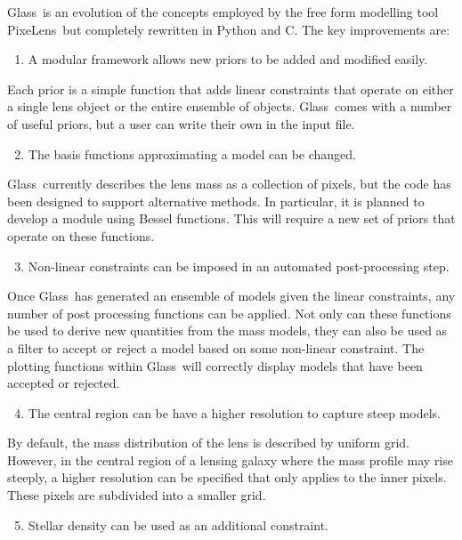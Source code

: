 \documentclass[galley]{mn2e}
\newcommand{\Glass}{{\sc Glass}}
\newcommand{\PixeLens}{{\sc PixeLens}}
\begin{document}
\Glass\ is an evolution of the concepts employed by the free form modelling tool
\PixeLens\ but completely rewritten in Python and C. The key improvements are:
%
\begin{enumerate}
  \setcounter{enumi}{0}
  \item A modular framework allows new priors to be added and modified easily.
\end{enumerate}
%
Each prior is a simple function that adds linear constraints that operate on either
a single lens object or the entire ensemble of objects. \Glass\ comes with a number
of useful priors, but a user can write their own in the input file.
%
\begin{enumerate}
  \setcounter{enumi}{1}
  \item The basis functions approximating a model can be changed. 
\end{enumerate}
%
\Glass\ currently describes the lens mass as a collection of pixels, but the code
has been designed to support alternative methods. In particular, it is planned
to develop a module using Bessel functions. This will require a new set of 
priors that operate on these functions.
%
\begin{enumerate}
  \setcounter{enumi}{2}
  \item Non-linear constraints can be imposed in an automated post-processing step. 
\end{enumerate}
%
Once \Glass\ has generated an ensemble of models given the linear constraints, any number
of post processing functions can be applied. Not only can these functions be used to
derive new quantities from the mass models, they can also be used as a filter to 
accept or reject a model based on some non-linear constraint. The plotting functions
within \Glass\ will correctly display models that have been accepted or rejected.
%
\begin{enumerate}
  \setcounter{enumi}{3}
  \item The central region can be have a higher resolution to capture steep models. 
\end{enumerate}
%
By default, the mass distribution of the lens is described by uniform grid. However,
in the central region of a lensing galaxy where the mass profile may rise steeply,
a higher resolution can be specified that only applies to the inner pixels. These
pixels are subdivided into a smaller grid.
%
\begin{enumerate}
  \setcounter{enumi}{4}
  \item Stellar density can be used as an additional constraint.  
\end{enumerate}
\end{document}
